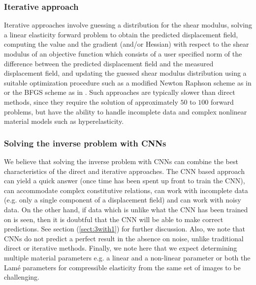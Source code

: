 \documentclass[12pt]{article}
\begin{document}
\subsubsection{Iterative approach} Iterative approaches \cite{paper:oberai2003,paper:gokhale2008,paper:kalle1996,paper:doyley,paper:goenezen2011} involve guessing a distribution for the shear modulus, solving a linear elasticity forward problem to obtain the predicted displacement field, computing the value and the gradient (and/or Hessian) with respect to the shear modulus of an objective function which consists of a user specified norm of the difference between the predicted displacement field and the measured displacement field, and updating the guessed shear modulus distribution using a suitable optimization procedure such as a modified Newton Raphson scheme as in \cite{paper:doyley} or the BFGS scheme as in \cite{paper:gokhale2008,paper:goenezen2011}. Such approaches are typically slower than direct methods, since they require the solution of approximately $50$ to $100$ forward problems, but have the ability to handle incomplete data and complex nonlinear material models such as hyperelasticity.
\subsubsection{Solving the inverse problem with CNNs}
We believe that solving the inverse problem with CNNs can combine the best characteristics of the direct and iterative approaches. The CNN based approach can yield a quick answer (once time has been spent up front to train the CNN), can accommodate complex constitutive relations, can work with incomplete data (e.g. only a single component of a displacement field) and can work with noisy data. On the other hand, if data which is unlike what the CNN has been trained on is seen, then it is doubtful that the CNN will be able to make correct predictions. See section (\ref{sect:3with1}) for further discussion. Also, we note that CNNs do not predict a perfect result in the absence on noise, unlike traditional direct or iterative methods. Finally, we note here that we expect determining multiple material parameters e.g. a linear and a non-linear parameter or both the Lam\'e parameters for compressible elasticity from the same set of images to be challenging.
\end{document}
